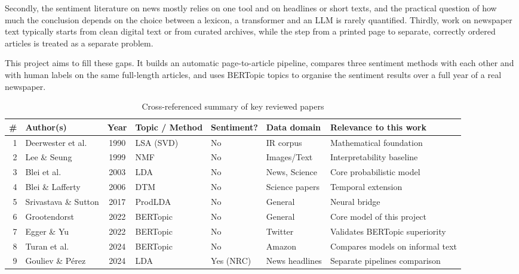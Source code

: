 Secondly, the sentiment literature on news mostly relies on one tool and on headlines or short texts, and the practical question of how much the conclusion depends on the choice between a lexicon, a transformer and an LLM is rarely quantified. Thirdly, work on newspaper text typically starts from clean digital text or from curated archives, while the step from a printed page to separate, correctly ordered articles is treated as a separate problem.

This project aims to fill these gaps. It builds an automatic page-to-article pipeline, compares three sentiment methods with each other and with human labels on the same full-length articles, and uses BERTopic topics to organise the sentiment results over a full year of a real newspaper.

\begin{table}[p]
\centering
\caption{Cross-referenced summary of key reviewed papers}
\label{tab:litsummary}
\footnotesize
\setlength{\tabcolsep}{3pt}
\renewcommand{\arraystretch}{1.15}
\begin{tabular}{@{}r p{2.5cm} c p{2.1cm} p{1.4cm} p{2.0cm} p{3.0cm}@{}}
\toprule
\textbf{\#} & \textbf{Author(s)} & \textbf{Year} & \textbf{Topic / Method} & \textbf{Sentiment?} & \textbf{Data domain} & \textbf{Relevance to this work}\\
\midrule
1  & Deerwester et al. & 1990 & LSA (SVD)       & No        & IR corpus        & Mathematical foundation\\
2  & Lee \& Seung      & 1999 & NMF             & No        & Images/Text      & Interpretability baseline\\
3  & Blei et al.       & 2003 & LDA             & No        & News, Science    & Core probabilistic model\\
4  & Blei \& Lafferty  & 2006 & DTM             & No        & Science papers   & Temporal extension\\
5  & Srivastava \& Sutton & 2017 & ProdLDA      & No        & General          & Neural bridge\\
6  & Grootendorst      & 2022 & BERTopic        & No        & General          & Core model of this project\\
7  & Egger \& Yu       & 2022 & BERTopic        & No        & Twitter          & Validates BERTopic superiority\\
8  & Turan et al.      & 2024 & BERTopic        & No        & Amazon           & Compares models on informal text\\
9  & Gouliev \& P{\'e}rez & 2024 & LDA          & Yes (NRC) & News headlines   & Separate pipelines comparison\\

\end{tabular}
\end{table}
